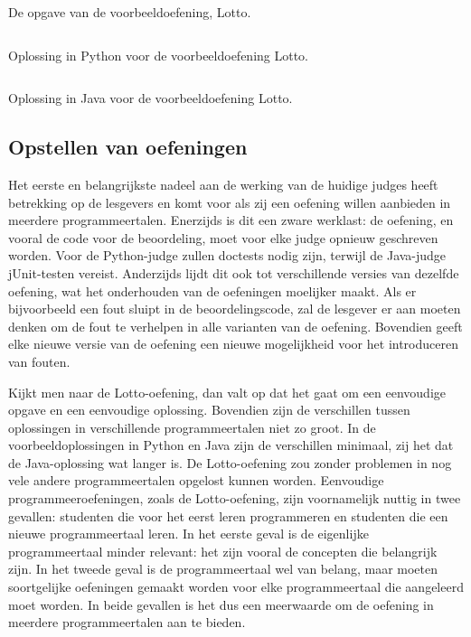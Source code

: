 \begin{listing}
    \begin{quote}
    \end{quote}
    \caption{De opgave van de voorbeeldoefening, Lotto.}
    \label{lst:lotto}
\end{listing}

\begin{listing}
    \inputminted{python3}{../../exercise/lotto/solution/correct.py}
    \caption{Oplossing in Python voor de voorbeeldoefening Lotto.}
    \label{lst:python-solution}
\end{listing}

\begin{listing}
    \inputminted{java}{../../exercise/lotto/solution/correct.java}
    \caption{Oplossing in Java voor de voorbeeldoefening Lotto.}
    \label{lst:java-solution}
\end{listing}

\subsection*{Opstellen van oefeningen}\label{subsec:opstellen-van-oefeningen}

Het eerste en belangrijkste nadeel aan de werking van de huidige judges heeft betrekking op de lesgevers en komt voor als zij een oefening willen aanbieden in meerdere programmeertalen.
Enerzijds is dit een zware werklast: de oefening, en vooral de code voor de beoordeling, moet voor elke judge opnieuw geschreven worden.
Voor de Python-judge zullen doctests nodig zijn, terwijl de Java-judge jUnit-testen vereist.
Anderzijds lijdt dit ook tot verschillende versies van dezelfde oefening, wat het onderhouden van de oefeningen moelijker maakt.
Als er bijvoorbeeld een fout sluipt in de beoordelingscode, zal de lesgever er aan moeten denken om de fout te verhelpen in alle varianten van de oefening.
Bovendien geeft elke nieuwe versie van de oefening een nieuwe mogelijkheid voor het introduceren van fouten.

Kijkt men naar de Lotto-oefening, dan valt op dat het gaat om een eenvoudige opgave en een eenvoudige oplossing.
Bovendien zijn de verschillen tussen oplossingen in verschillende programmeertalen niet zo groot.
In de voorbeeldoplossingen in Python en Java zijn de verschillen minimaal, zij het dat de Java-oplossing wat langer is.
De Lotto-oefening zou zonder problemen in nog vele andere programmeertalen opgelost kunnen worden.
Eenvoudige programmeeroefeningen, zoals de Lotto-oefening, zijn voornamelijk nuttig in twee gevallen: studenten die voor het eerst leren programmeren en studenten die een nieuwe programmeertaal leren.
In het eerste geval is de eigenlijke programmeertaal minder relevant: het zijn vooral de concepten die belangrijk zijn.
In het tweede geval is de programmeertaal wel van belang, maar moeten soortgelijke oefeningen gemaakt worden voor elke programmeertaal die aangeleerd moet worden.
In beide gevallen is het dus een meerwaarde om de oefening in meerdere programmeertalen aan te bieden.

